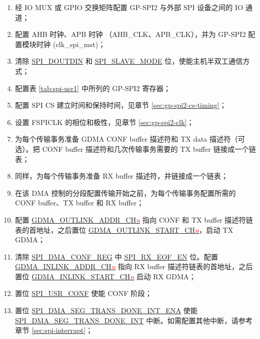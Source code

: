 \documentclass[main\_\_CN.tex]{subfiles}
\begin{document}
 \begin{enumerate}
    \item 经 IO MUX 或 GPIO 交换矩阵配置 GP-SPI2 与外部 SPI 设备之间的 IO 通道； 
    \item 配置 AHB 时钟、APB 时钟 （AHB\_CLK、APB\_CLK），并为 GP-SPI2 配置模块时钟 (clk\_spi\_mst)；

    \item 清除 \hyperref[fielddesc:SPIDOUTDIN]{SPI\_DOUTDIN} 和 \hyperref[fielddesc:SPISLAVEMODE]{SPI\_SLAVE\_MODE} 位，使能主机半双工通信方式；
    
    \item 配置表 \ref{tab:spi-usr1} 中所列的 GP-SPI2 寄存器；
    
    \item 配置 SPI CS 建立时间和保持时间，见章节  \ref{sec:gp-spi2-cs-timing}；
    
    \item 设置 FSPICLK 的相位和极性，见章节  \ref{sec:gp-spi2-clk}； 
 
   \item 为每个传输事务准备 GDMA CONF buffer 描述符和 TX data 描述符（可选）。把 CONF buffer 描述符和几次传输事务需要的 TX buffer 链接成一个链表；
   
   \item 同样，为每个传输事务准备 RX buffer 描述符，并链接成一个链表；
   \item 在该 DMA 控制的分段配置传输开始之前，为每个传输事务配置所需的 CONF buffer、TX buffer 和 RX buffer；
   
   \item 配置 \hyperref[fielddesc:GDMAOUTLINKADDRCHN]{GDMA\_OUTLINK\_ADDR\_CH\textcolor{red}{\it{n}}}  指向 CONF 和 TX buffer 描述符链表的首地址，之后置位 \hyperref[fielddesc:GDMAOUTLINKSTARTCHN]{GDMA\_OUTLINK\_START\_CH\textcolor{red}{\it{n}}}，启动 TX GDMA；

   \item 清除 \hyperref[regdesc:SPIDMACONFREG]{SPI\_DMA\_CONF\_REG} 中 \hyperref[fielddesc:SPIRXEOFEN]{SPI\_RX\_EOF\_EN} 位。配置 \hyperref[fielddesc:GDMAINLINKADDRCHN]{GDMA\_INLINK\_ADDR\_CH\textcolor{red}{\it{n}}}  指向 RX buffer 描述符链表的首地址，之后置位 \hyperref[fielddesc:GDMAINLINKSTARTCHN]{GDMA\_INLINK\_START\_CH\textcolor{red}{\it{n}}}  启动 RX GDMA； 
      
   \item 置位 \hyperref[fielddesc:SPIUSRCONF]{SPI\_USR\_CONF} 使能 CONF 阶段；
   \item 置位 \hyperref[fielddesc:SPIDMASEGTRANSDONEINTENA]{SPI\_DMA\_SEG\_TRANS\_DONE\_INT\_ENA} 使能 \hyperref[int:SPIDMASEGTRANSDONEINT]{SPI\_DMA\_SEG\_TRANS\_DONE\_INT} 中断。如需配置其他中断，请参考章节  \ref{sec:spi-interrupt}； 


\end{enumerate}
\end{document}
